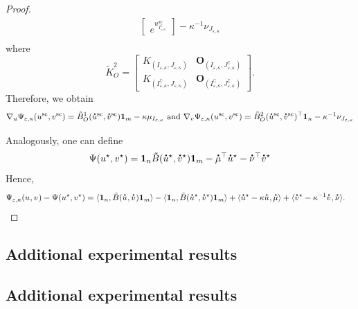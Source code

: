 \begin{proof}
\begin{align*}
\begin{bmatrix}
e^{u^{\text{sc}}_{I^\complement_{\varepsilon,\kappa}}}
\end{bmatrix}
- \kappa^{-1} \nu_{J_{\varepsilon,\kappa}}\\
\end{align*}
where 
\begin{equation*}
\tilde{K}^2_O = 
\begin{bmatrix}
K_{(I_{\varepsilon,\kappa}, J_{\varepsilon,\kappa})} &\mathbf O_{(I_{\varepsilon,\kappa}, J^\complement_{\varepsilon,\kappa})}\\
K_{(I^\complement_{\varepsilon,\kappa}, J_{\varepsilon,\kappa})} &\mathbf O_{(I^\complement_{\varepsilon,\kappa}, J^\complement_{\varepsilon,\kappa})}
\end{bmatrix}.
\end{equation*}
Therefore, we obtain 
\begin{equation*}
\nabla_u \Psi_{\varepsilon, \kappa}(u^{\text{sc}},v^{\text{sc}}) = \tilde{B}^1_O(\dt{u}^{\text{sc}},\dt{v}^{\text{sc}}) \mathbf 1_m - \kappa \mu_{I_{\varepsilon,\kappa}} \text{ and } \nabla_v \Psi_{\varepsilon, \kappa}(u^{\text{sc}},v^{\text{sc}}) = \tilde{B}^2_O(\dt{u}^{\text{sc}},\dt{v}^{\text{sc}})^\top \mathbf 1_n- \kappa^{-1} \nu_{J_{\varepsilon,\kappa}}
\end{equation*}

Analogously, one can define 
\begin{align*}
\Psi(u^\star, v^\star) = \mathbf{1}_n \tilde{B}(\dt{u}^\star, \dt{v}^\star) \mathbf{1}_m - \dt{\mu}^\top \dt{u}^\star - \dt{\nu}^\top \dt{v}^\star
\end{align*}
Hence,
\begin{align*} 
 \Psi_{\varepsilon, \kappa} (u^{\text{}} ,v^{\text{}}) -\Psi(u^\star, v^\star)
& = \inr{\mathbf 1_n, \tilde{B}(\dt{u}^{\text{}} ,\dt{v}^{\text{}})\mathbf 1_m} - \inr{\mathbf{1}_n, \tilde{B}(\dt{u}^{\star} ,\dt{v}^{\star})\mathbf 1_m} + \inr{\dt{u}^{\star} - \kappa \dt{u}^{\text{}}, \dt{\mu}} + \inr{\dt{v}^{\star} - \kappa^{-1}\dt{v}^{\text{}}, \dt{\nu}}.
\end{align*}
\end{proof}

\subsection{Additional experimental results}

\subsection{Additional experimental results}

